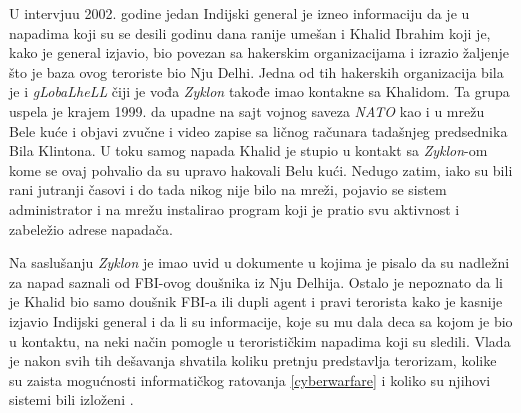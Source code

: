 \documentclass[a4paper]{article}
\begin{document}
U intervjuu 2002. godine jedan Indijski general je izneo informaciju da je u napadima koji su se desili godinu dana ranije umešan i Khalid Ibrahim koji je, kako je general izjavio, bio povezan sa hakerskim organizacijama i izrazio žaljenje što je baza ovog teroriste bio Nju Delhi. Jedna od tih hakerskih organizacija bila je i \textit{gLobaLheLL} čiji je vođa \textit{Zyklon} takođe imao kontakne sa Khalidom. Ta grupa uspela je krajem 1999. da upadne na sajt vojnog saveza \textit{NATO} kao i u mrežu Bele kuće i objavi zvučne i video zapise sa ličnog računara tadašnjeg predsednika Bila Klintona. U toku samog napada Khalid je stupio u kontakt sa \textit{Zyklon}-om kome se ovaj pohvalio da su upravo hakovali Belu kući. Nedugo zatim, iako su bili rani jutranji časovi i do tada nikog nije bilo na mreži, pojavio se sistem administrator i na mrežu instalirao program koji je pratio svu aktivnost i zabeležio adrese napadača.

Na saslušanju \textit{Zyklon} je imao uvid u dokumente u kojima je pisalo da su nadležni za napad saznali od FBI-ovog doušnika iz Nju Delhija. Ostalo je nepoznato da li je Khalid bio samo doušnik FBI-a ili dupli agent i pravi terorista kako je kasnije izjavio Indijski general i da li su informacije, koje su mu dala deca sa kojom je bio u kontaktu, na neki način pomogle u terorističkim napadima koji su sledili. Vlada je nakon svih tih dešavanja shvatila koliku pretnju predstavlja terorizam, kolike su zaista mogućnosti informatičkog ratovanja \ref{cyberwarfare} i koliko su njihovi sistemi bili izloženi \cite{intrusion}.
\end{document}
